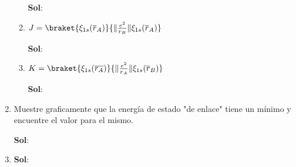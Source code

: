 \documentclass[12pt,a4paper]{article}
\providecommand{\norm}[1]{\lVert#1\rVert}
\begin{document}
\begin{enumerate}
\begin{enumerate}
    \textbf{Sol}:
    
    
    \item $J=\braket{\xi_{1s}(\overline{r}_A)}{\norm{\frac{e^2}{r_B}}\xi_{1s}(\overline{r}_A)}$
    
    \textbf{Sol}:
    
    
    \item $K = \braket{\xi_{1s}(\overline{r_A})}{\norm{\frac{e^2}{r_A}}\xi_{1s}(\overline{r}_B)}$
    
    \textbf{Sol}:
    
    
\end{enumerate}







\item Muestre graficamente que la energía de estado "de enlace" tiene un mínimo y encuentre el valor para el mismo.

\textbf{Sol}:









\item  

\textbf{Sol}:
    
    
\end{enumerate}
\end{document}
